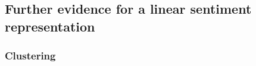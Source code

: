 \documentclass{article} %
\begin{document}
            
        

\subsection{Further evidence for a linear sentiment representation}

\subsubsection{Clustering}\label{section:pca-kmeans}
\end{document}
